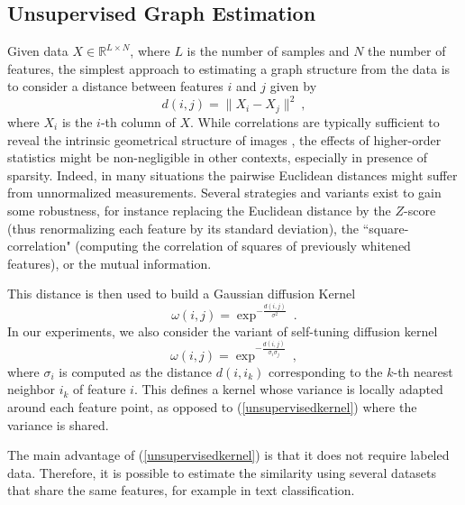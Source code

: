 \documentclass{article} %
\begin{document}
\subsection{ Unsupervised Graph Estimation }

Given data $X \in \mathbb{R}^{L \times N}$, where $L$ is the number of samples and $N$ the number of features,
the simplest approach to estimating a graph structure from the data is to consider a distance between features $i$ and $j$ given by
$$d(i,j) = \| X_i - X_j \|^2~,$$
where $X_i$ is the $i$-th column of $X$. 
While correlations are typically sufficient to reveal the intrinsic geometrical structure of images \cite{roux2008learning}, 
 the effects of higher-order statistics might be non-negligible in other contexts, especially in presence of sparsity. 
Indeed, in many situations the pairwise Euclidean distances might suffer from unnormalized measurements. Several strategies and variants 
exist to gain some robustness, for instance replacing the Euclidean distance by the $Z$-score (thus renormalizing each feature by its standard
deviation), the ``square-correlation" (computing the correlation of squares of previously whitened features), or the mutual information.

This distance is then used to build a Gaussian diffusion Kernel \cite{belkin2001laplacian} 
\begin{equation}
\label{unsupervisedkernel}
\omega(i,j) = \exp^{-\frac{d(i,j)}{\sigma^2}}~.
\end{equation}
In our experiments, we also consider the variant of self-tuning diffusion kernel \cite{zelnik2004self}
$$\omega(i,j) = \exp^{-\frac{d(i,j)}{\sigma_i \sigma_j}}~,$$
where $\sigma_i$ is computed as the distance $d(i,i_{k})$ corresponding to the $k$-th nearest neighbor $i_{k}$ of feature $i$. 
This defines a kernel whose variance is locally adapted around each feature point, as opposed to (\ref{unsupervisedkernel}) where
the variance is shared. 


The main advantage of (\ref{unsupervisedkernel}) is that it does not require labeled data. Therefore, it is possible to estimate 
the similarity using several datasets that share the same features, for example in text classification. 
\end{document}
